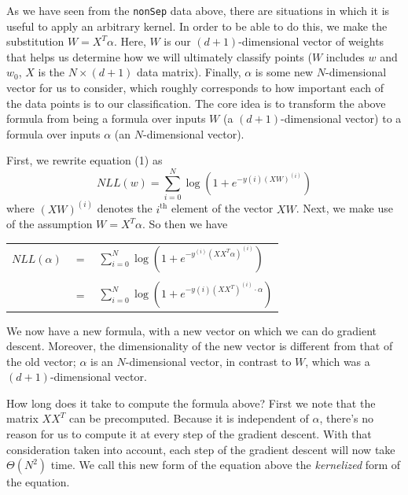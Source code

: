 \documentclass{sigchi}
\begin{document}
As we have seen from the \texttt{nonSep} data above, there are situations in which it is useful to apply an arbitrary kernel. In order to be able to do this, we make the substitution $W = X^T \alpha$. Here, $W$ is our $(d+1)$-dimensional vector of weights that helps us determine how we will ultimately classify points ($W$ includes $w$ and $w_0$, $X$ is the $N \times (d+1)$ data matrix). Finally, $\alpha$ is some new $N$-dimensional vector for us to consider, which roughly corresponds to how important each of the data points is to our classification. The core idea is to transform the above formula from being a formula over inputs $W$ (a $(d + 1)$-dimensional vector) to a formula over inputs $\alpha$ (an $N$-dimensional vector). 

First, we rewrite equation (1) as
$$NLL(w) = \sum_{i=0}^N \log\left(1+e^{-y{(i)}(XW)^{(i)}}\right)$$
where $(XW)^{(i)}$ denotes the $i^{\textrm{th}}$ element of the vector $XW$. Next, we make use of the assumption $W = X^T\alpha$. So then we have

\begin{center}
\begin{tabular}{r c l}
$NLL(\alpha)$&$=$&$\displaystyle \sum_{i=0}^N \log \left(1+e^{-y^{(i)}(XX^T\alpha)^{(i)}}\right)$\\
&&\\
&$=$&$\displaystyle \sum_{i=0}^N \log\left(1+e^{-y{(i)}(XX^T)^{(i)} \cdot \alpha}\right)$
\end{tabular}
\end{center}

We now have a new formula, with a new vector on which we can do gradient descent. Moreover, the dimensionality of the new vector is different from that of the old vector; $\alpha$ is an $N$-dimensional vector, in contrast to $W$, which was a $(d + 1)$-dimensional vector. 

How long does it take to compute the formula above? %
First we note that the matrix $XX^T$ can be precomputed. Because it is independent of $\alpha$, there's no reason for us to compute it at every step of the gradient descent. With that consideration taken into account, each step of the gradient descent will now take $\Theta(N^2)$ time. We call this new form of the equation above the \emph{kernelized} form of the equation.%
\end{document}
